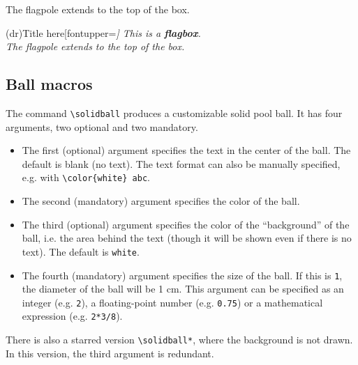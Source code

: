 \documentclass{article}
\begin{document}
{\begin{verbbox}
\begin{flagbox}
The flagpole extends to the top of the box.
\end{flagbox}
\end{verbbox}
\begin{verbbox}
\begin{flagbox}(dr){Title here}[fontupper=\itshape]
This is a \textbf{flagbox}.\\

The flagpole extends to the top of the box.
\end{flagbox}
\end{verbbox}

\subsection{Ball macros}

The command \verb!\solidball! produces a customizable solid pool ball. It has four arguments, two optional and two mandatory.
\begin{itemize}
    \item The first (optional) argument specifies the text in the center of the ball. The default is blank (no text). The text format can also be manually specified, e.g. with \verb!\color{white} abc!.
    \item The second (mandatory) argument specifies the color of the ball.
    \item The third (optional) argument specifies the color of the ``background'' of the ball, i.e. the area behind the text (though it will be shown even if there is no text). The default is \texttt{white}.
    \item The fourth (mandatory) argument specifies the size of the ball. If this is \texttt{1}, the diameter of the ball will be 1 cm. This argument can be specified as an integer (e.g. \texttt{2}), a floating-point number (e.g. \texttt{0.75}) or a mathematical expression (e.g. \texttt{2*3/8}).
\end{itemize}

There is also a starred version \verb!\solidball*!, where the background is not drawn. In this version, the third argument is redundant.

}
\end{document}
